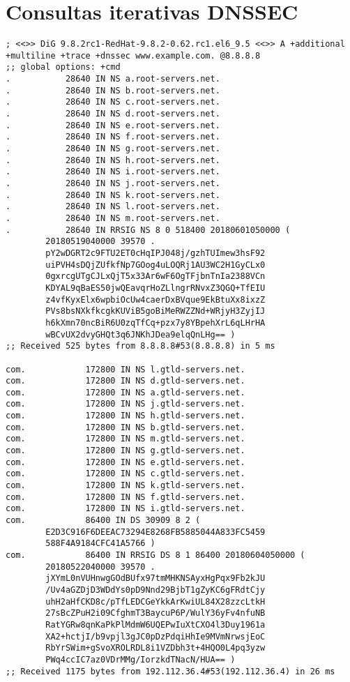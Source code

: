 \documentclass[11pt]{article}
\begin{document}
\section{Consultas iterativas DNSSEC}

\begin{lstlisting}
; <<>> DiG 9.8.2rc1-RedHat-9.8.2-0.62.rc1.el6_9.5 <<>> A +additional +multiline +trace +dnssec www.example.com. @8.8.8.8
;; global options: +cmd
.			28640 IN NS a.root-servers.net.
.			28640 IN NS b.root-servers.net.
.			28640 IN NS c.root-servers.net.
.			28640 IN NS d.root-servers.net.
.			28640 IN NS e.root-servers.net.
.			28640 IN NS f.root-servers.net.
.			28640 IN NS g.root-servers.net.
.			28640 IN NS h.root-servers.net.
.			28640 IN NS i.root-servers.net.
.			28640 IN NS j.root-servers.net.
.			28640 IN NS k.root-servers.net.
.			28640 IN NS l.root-servers.net.
.			28640 IN NS m.root-servers.net.
.			28640 IN RRSIG NS 8 0 518400 20180601050000 (
        20180519040000 39570 .
        pY2wDGRT2c9FTU2ET0cHqIPJ048j/gzhTUImew3hsF92
        uiPVH4sDQjZUfkfNp7GOog4uLOQRj1AU3WC2H1GyCLx0
        0gxrcgUTgCJLxQjT5x33Ar6wF6OgTFjbnTnIa2388VCn
        KDYAL9qBaES50jwQEavqrHoZLlngrRNvxZ3QGQ+TfEIU
        z4vfKyxElx6wpbiOcUw4caerDxBVque9EkBtuXx8ixzZ
        PVs8bsNXkfkcgkKUViB5goBiMeRWZZNd+WRjyH3ZyjIJ
        h6kXmn70ncBiR6U0zqTfCq+pzx7y8YBpehXrL6qLHrHA
        wBCvUX2dvyGHQt3q6JNKhJDea9elqQnLHg== )
;; Received 525 bytes from 8.8.8.8#53(8.8.8.8) in 5 ms

com.			172800 IN NS l.gtld-servers.net.
com.			172800 IN NS d.gtld-servers.net.
com.			172800 IN NS a.gtld-servers.net.
com.			172800 IN NS j.gtld-servers.net.
com.			172800 IN NS h.gtld-servers.net.
com.			172800 IN NS b.gtld-servers.net.
com.			172800 IN NS m.gtld-servers.net.
com.			172800 IN NS g.gtld-servers.net.
com.			172800 IN NS e.gtld-servers.net.
com.			172800 IN NS c.gtld-servers.net.
com.			172800 IN NS k.gtld-servers.net.
com.			172800 IN NS f.gtld-servers.net.
com.			172800 IN NS i.gtld-servers.net.
com.			86400 IN DS 30909 8 2 (
        E2D3C916F6DEEAC73294E8268FB5885044A833FC5459
        588F4A9184CFC41A5766 )
com.			86400 IN RRSIG DS 8 1 86400 20180604050000 (
        20180522040000 39570 .
        jXYmL0nVUHnwgGOdBUfx97tmMHKNSAyxHgPqx9Fb2kJU
        /Uv4aGZDjD3WDdYs0pD9Nnd29BjbT1gZyKC6gFRdtCjy
        uhH2aHfCKD8c/pTfLEDCGeYkkArKwiUL84X28zzcLtkH
        27sBcZPuH2i09CfghmT3BaycuP6P/WulY36yFv4nfuNB
        RatYGRw8qnKaPkPlMdmW6UQEPwIuXtCXO4l3Duy1961a
        XA2+hctjI/b9vpjl3gJC0pDzPdqiHhIe9MVmNrwsjEoC
        RbYrSWim+gSvoXROLRDL8i1VZDbh3t+4HQO0L4pq3yzw
        PWq4ccIC7az0VDrMMg/IorzkdTNacN/HUA== )
;; Received 1175 bytes from 192.112.36.4#53(192.112.36.4) in 26 ms


\end{lstlisting}
\end{document}
